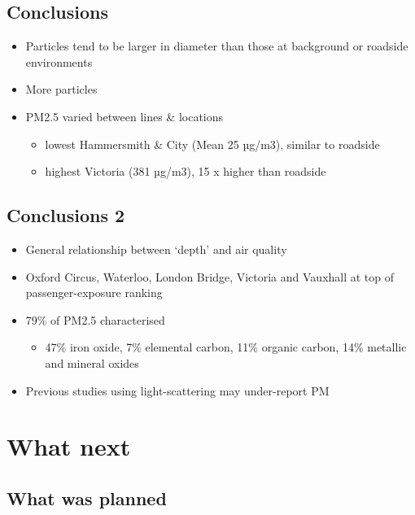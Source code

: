 \documentclass[]{article}
\providecommand{\tightlist}{%
  \setlength{\itemsep}{0pt}\setlength{\parskip}{0pt}}
\begin{document}
\hypertarget{conclusions-1}{%
\subsection{Conclusions}\label{conclusions-1}}

\begin{itemize}
\tightlist
\item
  Particles tend to be larger in diameter than those at background or
  roadside environments
\item
  More particles
\item
  PM2.5 varied between lines \& locations

  \begin{itemize}
  \tightlist
  \item
    lowest Hammersmith \& City (Mean 25 µg/m3), similar to roadside
  \item
    highest Victoria (381 µg/m3), 15 x higher than roadside
  \end{itemize}
\end{itemize}

\hypertarget{conclusions-2}{%
\subsection{Conclusions 2}\label{conclusions-2}}

\begin{itemize}
\tightlist
\item
  General relationship between `depth' and air quality
\item
  Oxford Circus, Waterloo, London Bridge, Victoria and Vauxhall at top
  of passenger-exposure ranking
\item
  79\% of PM2.5 characterised

  \begin{itemize}
  \tightlist
  \item
    47\% iron oxide, 7\% elemental carbon, 11\% organic carbon, 14\%
    metallic and mineral oxides
  \end{itemize}
\item
  Previous studies using light-scattering may under-report PM
\end{itemize}

\hypertarget{what-next}{%
\section{What next}\label{what-next}}

\hypertarget{what-was-planned}{%
\subsection{What was planned}\label{what-was-planned}}
\end{document}
